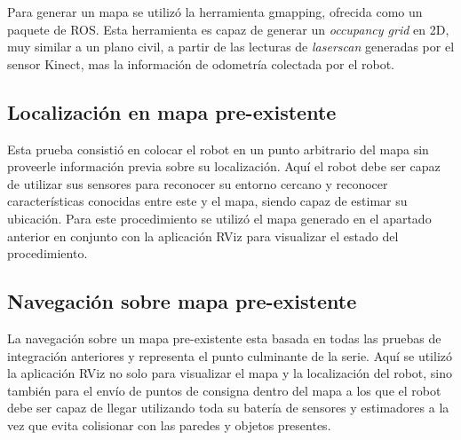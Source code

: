 Para generar un mapa se utilizó la herramienta gmapping\protect\footnotemark, ofrecida como un paquete de ROS. Esta herramienta es capaz de generar un \textit{occupancy grid} en 2D, muy similar a un plano civil, a partir de las lecturas de \textit{laserscan} generadas por el sensor Kinect, mas la información de odometría colectada por el robot.


\subsection{Localización en mapa pre-existente}

Esta prueba consistió en colocar el robot en un punto arbitrario del mapa sin proveerle información previa sobre su localización. Aquí el robot debe ser capaz de utilizar sus sensores para reconocer su entorno cercano y reconocer características conocidas entre este y el mapa, siendo capaz de estimar su ubicación. Para este procedimiento se utilizó el mapa generado en el apartado anterior en conjunto con la aplicación RViz para visualizar el estado del procedimiento.

\subsection{Navegación sobre mapa pre-existente}

La navegación sobre un mapa pre-existente esta basada en todas las pruebas de integración anteriores y representa el punto culminante de la serie. Aquí se utilizó la aplicación RViz no solo para visualizar el mapa y la localización del robot, sino también para el envío de puntos de consigna dentro del mapa a los que el robot debe ser capaz de llegar utilizando toda su batería de sensores y estimadores a la vez que evita colisionar con las paredes y objetos presentes.

\label{sec:pruebasIN}